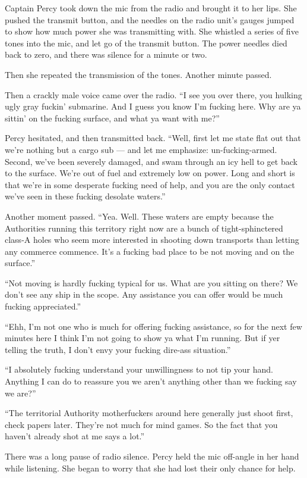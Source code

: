 \documentclass[
]{scrbook}
\begin{document}
Captain Percy took down the mic from the radio and brought it to her
lips. She pushed the transmit button, and the needles on the radio
unit's gauges jumped to show how much power she was transmitting with.
She whistled a series of five tones into the mic, and let go of the
transmit button. The power needles died back to zero, and there was
silence for a minute or two.

Then she repeated the transmission of the tones. Another minute passed.

Then a crackly male voice came over the radio. ``I see you over there,
you hulking ugly gray fuckin' submarine. And I guess you know I'm
fucking here. Why are ya sittin' on the fucking surface, and what ya
want with me?''

Percy hesitated, and then transmitted back. ``Well, first let me state
flat out that we're nothing but a cargo sub --- and let me emphasize:
un-fucking-armed. Second, we've been severely damaged, and swam through
an icy hell to get back to the surface. We're out of fuel and extremely
low on power. Long and short is that we're in some desperate fucking
need of help, and you are the only contact we've seen in these fucking
desolate waters.''

Another moment passed. ``Yea. Well. These waters are empty because the
Authorities running this territory right now are a bunch of
tight-sphinctered class-A holes who seem more interested in shooting
down transports than letting any commerce commence. It's a fucking bad
place to be not moving and on the surface.''

``Not moving is hardly fucking typical for us. What are you sitting on
there? We don't see any ship in the scope. Any assistance you can offer
would be much fucking appreciated.''

``Ehh, I'm not one who is much for offering fucking assistance, so for
the next few minutes here I think I'm not going to show ya what I'm
running. But if yer telling the truth, I don't envy your fucking
dire-ass situation.''

``I absolutely fucking understand your unwillingness to not tip your
hand. Anything I can do to reassure you we aren't anything other than we
fucking say we are?''

``The territorial Authority motherfuckers around here generally just
shoot first, check papers later. They're not much for mind games. So the
fact that you haven't already shot at me says a lot.''

There was a long pause of radio silence. Percy held the mic off-angle in
her hand while listening. She began to worry that she had lost their
only chance for help.
\end{document}
